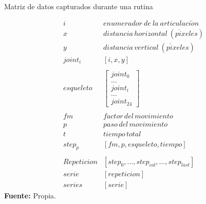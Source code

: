 \begin{formula}[H]
	\centering
	\caption{Matriz de datos capturados durante una rutina}
	\label{frm:MatrizDatosRepeticion}
	\begin{equation}
\begin{matrix}
i & enumerador\: de\: la\: articulaci\acute{o}n \\ 
x & distancia\, horizontal \: (p\acute{i}xeles) \\ 
y & distancia\, vertical\: (p\acute{i}xeles) \\ 
joint_{i}& [i,x,y] \\ 
 & \\ 
esqueleto & \begin{bmatrix}
joint_{0} \\ 
... \\ 
joint_{i}\\ 
... \\ 
joint_{24}
\end{bmatrix}  \\ 
 & \\ 
fm & factor \, del \, movimiento \\ 
p  & paso \, del \,movimiento \\ 
t  & tiempo \, total \\ 
step_{p}  & [fm,p,esqueleto, tiempo] \\
 & \\ 
Repeticion & [step_{0}, ...,  step_{col}, ..., step_{last}] \\
serie & [repeticion] \\
series & [serie]
\end{matrix}
	\end{equation}
	\textbf{Fuente:} Propia.
\end{formula}
